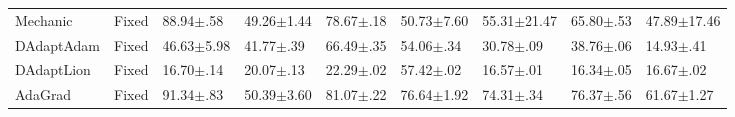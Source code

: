 \begin{tabular}{lllllllll}
    Mechanic                 & Fixed             & 88.94$\pm$.58           & 49.26$\pm$1.44           & 78.67$\pm$.18           & 50.73$\pm$7.60          & 55.31$\pm$21.47         & 65.80$\pm$.53           & 47.89$\pm$17.46         \\
    DAdaptAdam               & Fixed             & 46.63$\pm$5.98          & 41.77$\pm$.39            & 66.49$\pm$.35           & 54.06$\pm$.34           & 30.78$\pm$.09           & 38.76$\pm$.06           & 14.93$\pm$.41           \\
    DAdaptLion               & Fixed             & 16.70$\pm$.14           & 20.07$\pm$.13            & 22.29$\pm$.02           & 57.42$\pm$.02           & 16.57$\pm$.01           & 16.34$\pm$.05           & 16.67$\pm$.02           \\
    AdaGrad                  & Fixed             & 91.34$\pm$.83           & 50.39$\pm$3.60           & 81.07$\pm$.22           & 76.64$\pm$1.92          & 74.31$\pm$.34           & 76.37$\pm$.56           & 61.67$\pm$1.27          \\
    \bottomrule
\end{tabular}
